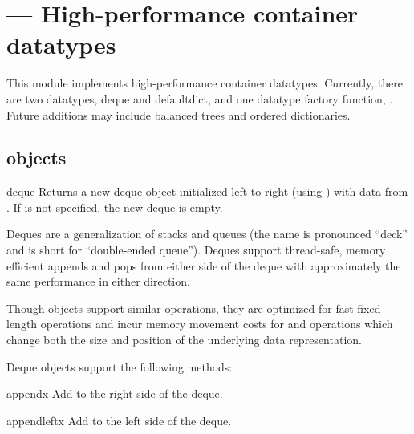 \section{ ---
         High-performance container datatypes}



This module implements high-performance container datatypes.  Currently,
there are two datatypes, deque and defaultdict, and one datatype factory
function, .
Future additions may include balanced trees and ordered dictionaries.

\subsection{ objects \label{deque-objects}}

\begin{funcdesc}{deque}{}
  Returns a new deque object initialized left-to-right (using
  ) with data from .  If 
  is not specified, the new deque is empty.

  Deques are a generalization of stacks and queues (the name is pronounced
  ``deck'' and is short for ``double-ended queue'').  Deques support
  thread-safe, memory efficient appends and pops from either side of the deque
  with approximately the same  performance in either direction.

  Though  objects support similar operations, they are optimized
  for fast fixed-length operations and incur  memory movement costs
  for  and  operations which change both the
  size and position of the underlying data representation.
\end{funcdesc}

Deque objects support the following methods:

\begin{methoddesc}{append}{x}
   Add  to the right side of the deque.
\end{methoddesc}

\begin{methoddesc}{appendleft}{x}
   Add  to the left side of the deque.
\end{methoddesc}

